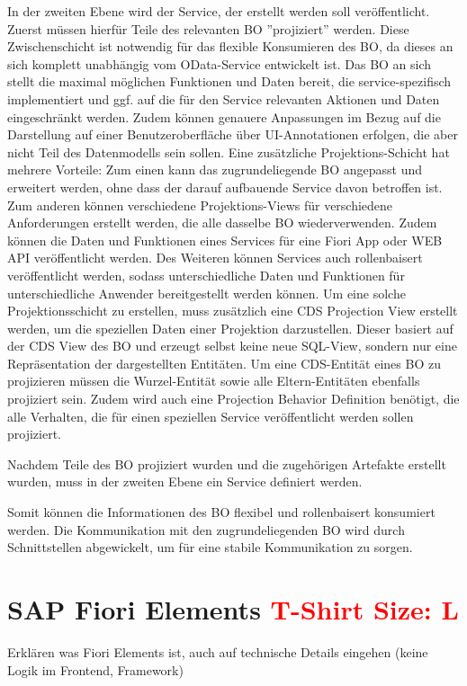 In der zweiten Ebene wird der Service, der erstellt werden soll veröffentlicht. Zuerst müssen hierfür Teile des relevanten BO ''projiziert'' werden. Diese Zwischenschicht ist notwendig für das flexible Konsumieren des BO, da dieses an sich komplett unabhängig vom OData-Service entwickelt ist. Das BO an sich stellt die maximal möglichen Funktionen und Daten bereit, die service-spezifisch implementiert und ggf. auf die für den Service relevanten Aktionen und Daten eingeschränkt werden. Zudem können genauere Anpassungen \zB im Bezug auf die Darstellung auf einer Benutzeroberfläche über UI-Annotationen erfolgen, die aber nicht Teil des Datenmodells sein sollen. Eine zusätzliche Projektions-Schicht hat mehrere Vorteile: Zum einen kann das zugrundeliegende BO angepasst und erweitert werden, ohne dass der darauf aufbauende Service davon betroffen ist. Zum anderen können verschiedene Projektions-Views für verschiedene Anforderungen erstellt werden, die alle dasselbe BO wiederverwenden. Zudem können die Daten und Funktionen eines Services für eine Fiori App oder WEB API veröffentlicht werden. Des Weiteren können Services auch rollenbaisert veröffentlicht werden, sodass unterschiedliche Daten und Funktionen für unterschiedliche Anwender bereitgestellt werden können. Um eine solche Projektionsschicht zu erstellen, muss zusätzlich eine CDS Projection View erstellt werden, um die speziellen Daten einer Projektion darzustellen. Dieser basiert auf der CDS View des BO und erzeugt selbst keine neue SQL-View, sondern nur eine Repräsentation der dargestellten Entitäten. Um eine CDS-Entität eines BO zu projizieren müssen die Wurzel-Entität sowie alle Eltern-Entitäten ebenfalls projiziert sein. Zudem wird auch eine Projection Behavior Definition benötigt, die alle Verhalten, die für einen speziellen Service veröffentlicht werden sollen projiziert.

Nachdem Teile des BO projiziert wurden und die zugehörigen Artefakte erstellt wurden, muss in der zweiten Ebene ein Service definiert werden.

Somit können die Informationen des BO flexibel und rollenbaisert konsumiert werden. Die Kommunikation mit den zugrundeliegenden BO wird durch Schnittstellen abgewickelt, um für eine stabile Kommunikation zu sorgen.

\section{SAP Fiori Elements \textcolor{red}{T-Shirt Size: L}}

Erklären was Fiori Elements ist, auch auf technische Details eingehen (keine Logik im Frontend, Framework)